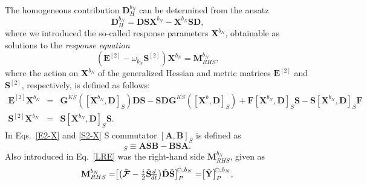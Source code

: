 \documentclass[%
 reprint,
 amsmath,amssymb,
 aps,
]{revtex4-1}
\begin{document}
The homogeneous contribution $\mathbf{D}_{H}^{b_N}$ can be determined from the ansatz 
\begin{equation}\label{D-H-bn}
\mathbf{D}_{H}^{b_N} = \mathbf{D} \mathbf{S} \mathbf{X}^{b_N} -  \mathbf{X}^{b_N} \mathbf{S} \mathbf{D} \text{,}
\end{equation}
where we introduced the so-called response parameters $\mathbf{X}^{b_N}$, obtainable as solutions to the \textit{response equation}
\begin{equation}
\label{LRE}
(\mathbf{E}^{[2]} - \omega_{b_N} \mathbf{S}^{[2]}) \mathbf{X}^{b_N} = \mathbf{M}_{RHS}^{b_N}\text{,}
\end{equation}
where the action on $\mathbf{X}^{b_N}$ of the generalized Hessian and metric matrices $\mathbf{E}^{[2]}$ and $\mathbf{S}^{[2]}$, respectively, is defined as follows:
\begin{eqnarray}\label{E2-X}
\mathbf{E}^{[2]} \mathbf{X}^{b_{N}}  &=&
\mathbf{G}^{KS}([\mathbf{X}^{b_{N}}, \mathbf{D}]_S) \mathbf{D} \mathbf{S} - 
\mathbf{S} \mathbf{D} \mathbf{G}^{KS}([\mathbf{X}^b, \mathbf{D}]_S) +
\mathbf{F} [\mathbf{X}^{b_{N}},\mathbf{D}]_S \mathbf{S} 
- \mathbf{S} [\mathbf{X}^{b_{N}},\mathbf{D}]_S \mathbf{F} 
\\ \label{S2-X}
\mathbf{S}^{[2]} \mathbf{X}^{b_{N}} &=& 
\mathbf{S} [\mathbf{X}^{b_{N}},\mathbf{D}]_S \mathbf{S} \text{.}
\end{eqnarray}
In Eqs.~\eqref{E2-X} and \eqref{S2-X} S commutator $[\mathbf{A}, \mathbf{B}]_S$ is defined as
\begin{equation}
[\mathbf{A}, \mathbf{B}]_S \equiv \mathbf{ASB} - \mathbf{BSA}\text{.}
\end{equation}
Also introduced in Eq.~\eqref{LRE} was the right-hand side $\mathbf{M}_{RHS}^{b_N}$, given as
\begin{eqnarray}\label{MRHS}
\mathbf{M}_{RHS}^{b_N} = \bigr[\bigl(\tilde{\mbox{\boldmath $ \mathcal{F} $}} - {\textstyle \frac{i}{2}} \tilde{\mathbf{S}} 
\!{\textstyle \frac{d}{dt}} \bigr) \tilde{\mathbf{D}} \tilde{\mathbf{S}} \bigr]^{\negmedspace \circleddash, b_N}_{ P } = \bigr[ \tilde{\mathbf{Y}} \bigr]^{\negmedspace \circleddash, b_N}_{ P } \text{,}
\end{eqnarray}
\end{document}
